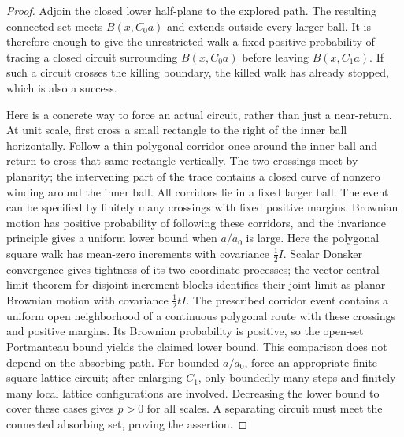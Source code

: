 \begin{proof}
Adjoin the closed lower half-plane to the explored path.  The resulting
connected set meets $B(x,C_0a)$ and extends outside every larger ball.
It is therefore enough to give the unrestricted walk a fixed positive
probability of tracing a closed circuit surrounding $B(x,C_0a)$ before
leaving $B(x,C_1a)$.  If such a circuit crosses the killing boundary,
the killed walk has already stopped, which is also a success.

Here is a concrete way to force an actual circuit, rather than just a
near-return.  At unit scale, first cross a small rectangle to the right
of the inner ball horizontally.  Follow a thin polygonal corridor once
around the inner ball and return to cross that same rectangle vertically.
The two crossings meet by planarity; the intervening part of the trace
contains a closed curve of nonzero winding around the inner ball.  All
corridors lie in a fixed larger ball.  The event can be specified by
finitely many crossings with fixed positive margins.  Brownian motion
has positive probability of following these corridors, and the
invariance principle gives a uniform lower bound when $a/a_0$ is large.
Here the polygonal square walk has mean-zero increments with covariance
$\tfrac12 I$. Scalar Donsker convergence
\cite[Theorems~8.1.4 and~8.1.11]{Durrett} gives tightness of its two
coordinate processes; the vector central limit theorem for disjoint
increment blocks identifies their joint limit as planar Brownian
motion with covariance $\tfrac12 tI$. The prescribed corridor event
contains a uniform open neighborhood of a continuous polygonal route
with these crossings and positive margins. Its Brownian probability is
positive, so the open-set Portmanteau bound yields the claimed lower
bound. This comparison does not depend on the absorbing path.
For bounded $a/a_0$, force an appropriate finite square-lattice circuit;
after enlarging $C_1$, only boundedly many steps and finitely many local
lattice configurations are involved.  Decreasing the lower bound to
cover these cases gives $p>0$ for all scales.  A separating circuit must
meet the connected absorbing set, proving the assertion.
\end{proof}

